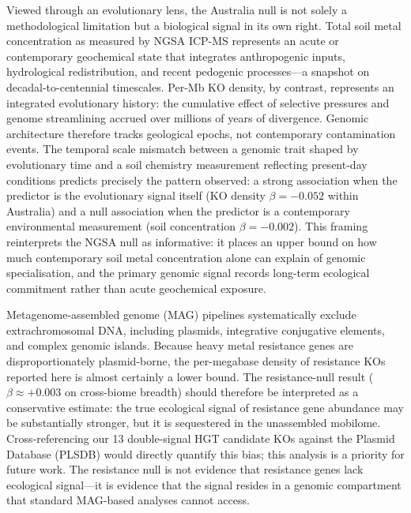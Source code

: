 \documentclass[times]{zHenriquesLab-StyleBioRxiv}
\begin{document}
Viewed through an evolutionary lens, the Australia null is not solely a
methodological limitation but a biological signal in its own right. Total soil
metal concentration as measured by NGSA ICP-MS represents an acute or
contemporary geochemical state that integrates anthropogenic inputs, hydrological
redistribution, and recent pedogenic processes---a snapshot on
decadal-to-centennial timescales. Per-Mb KO density, by contrast, represents an
integrated evolutionary history: the cumulative effect of selective pressures
and genome streamlining accrued over millions of years of divergence. Genomic
architecture therefore tracks geological epochs, not contemporary contamination
events. The temporal scale mismatch between a genomic trait shaped by
evolutionary time and a soil chemistry measurement reflecting present-day
conditions predicts precisely the pattern observed: a strong association when
the predictor is the evolutionary signal itself (KO density $\beta = -0.052$
within Australia) and a null association when the predictor is a contemporary
environmental measurement (soil concentration $\beta = -0.002$). This framing
reinterprets the NGSA null as informative: it places an upper bound on how much
contemporary soil metal concentration alone can explain of genomic
specialisation, and the primary genomic signal records
long-term ecological commitment rather than acute geochemical exposure.

Metagenome-assembled genome (MAG) pipelines systematically exclude
extrachromosomal DNA, including plasmids, integrative conjugative elements,
and complex genomic islands. Because heavy metal resistance genes are
disproportionately plasmid-borne, the per-megabase density of resistance KOs
reported here is almost certainly a lower bound. The resistance-null result
($\beta \approx +0.003$ on cross-biome breadth) should therefore be
interpreted as a conservative estimate: the true ecological signal of
resistance gene abundance may be substantially stronger, but it is sequestered
in the unassembled mobilome. Cross-referencing our 13 double-signal HGT
candidate KOs against the Plasmid Database (PLSDB) would directly quantify
this bias; this analysis is a priority for future work. The resistance null is
not evidence that resistance genes lack ecological signal---it is evidence that
the signal resides in a genomic compartment that standard MAG-based analyses
cannot access.

\end{document}
